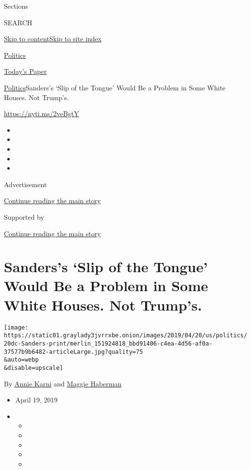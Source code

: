 Sections

SEARCH

\protect\hyperlink{site-content}{Skip to
content}\protect\hyperlink{site-index}{Skip to site index}

\href{https://www.nytimes3xbfgragh.onion/section/politics}{Politics}

\href{https://myaccount.nytimes3xbfgragh.onion/auth/login?response_type=cookie\&client_id=vi}{}

\href{https://www.nytimes3xbfgragh.onion/section/todayspaper}{Today's
Paper}

\href{/section/politics}{Politics}\textbar{}Sanders's `Slip of the
Tongue' Would Be a Problem in Some White Houses. Not Trump's.

\url{https://nyti.ms/2veBgtY}

\begin{itemize}
\item
\item
\item
\item
\item
\end{itemize}

Advertisement

\protect\hyperlink{after-top}{Continue reading the main story}

Supported by

\protect\hyperlink{after-sponsor}{Continue reading the main story}

\hypertarget{sanderss-slip-of-the-tongue-would-be-a-problem-in-some-white-houses-not-trumps}{%
\section{Sanders's `Slip of the Tongue' Would Be a Problem in Some White
Houses. Not
Trump's.}\label{sanderss-slip-of-the-tongue-would-be-a-problem-in-some-white-houses-not-trumps}}

\texttt{[image: https://static01.graylady3jvrrxbe.onion/images/2019/04/20/us/politics/20dc-Sanders-print/merlin\_151924818\_bbd91406-c4ea-4d56-af0a-37577b9b6482-articleLarge.jpg?quality=75\\\&auto=webp\\\&disable=upscale]}

By \href{https://www.nytimes3xbfgragh.onion/by/annie-karni}{Annie Karni}
and \href{https://www.nytimes3xbfgragh.onion/by/maggie-haberman}{Maggie
Haberman}

\begin{itemize}
\item
  April 19, 2019
\item
  \begin{itemize}
  \item
  \item
  \item
  \item
  \item
  \end{itemize}
\end{itemize}

